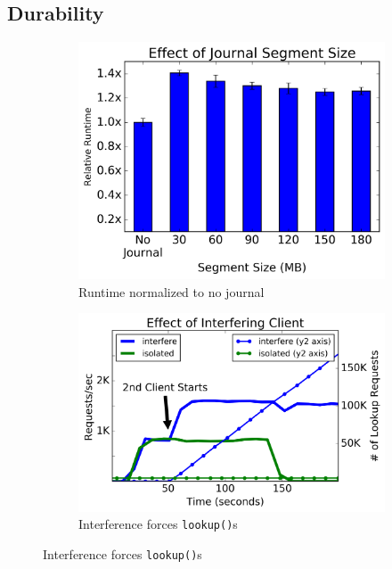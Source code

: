 \subsection{Durability}
\label{sec:durability}

\begin{figure}[t]
  \centering
  \begin{subfigure}[b]{.3\linewidth}
      \centering
      \includegraphics[width=1.0\linewidth]{graphs/slowdown-journal.png}
      \caption{Runtime normalized to no journal} \label{fig:overhead-a}
  \end{subfigure}
  \begin{subfigure}[b]{.3\linewidth}
      \centering
      \includegraphics[width=1.2\linewidth]{graphs/behavior-interfere.png}
      \caption{Interference forces \texttt{lookup()}s}

\end{subfigure}
\end{figure}
